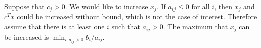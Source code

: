 \documentclass[12pt, A4paper]{article}
\theoremstyle{definition}
\begin{document}
Suppose that $c_j > 0$.  We would like to increase $x_j$.  If $a_{ij} \le 0$ for all $i$, then $x_j$ and $c^Tx$ could be increased without bound, which is not the case of interest.    Therefore assume that there is at least one $i$ such that $a_{ij} > 0$.  The maximum that $x_j$ can be increased is $\min_{i : a_{ij} > 0} b_i/a_{ij}$.  




\end{document}
